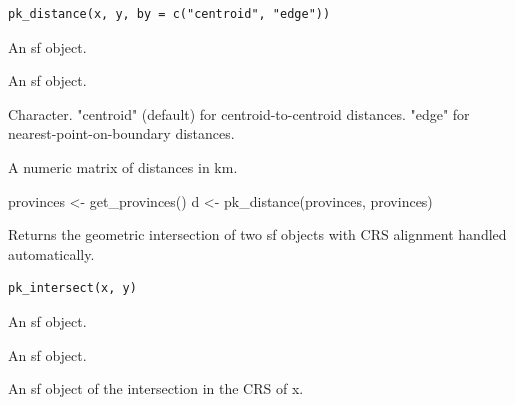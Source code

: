 \documentclass[a4paper]{book}
\begin{document}
%
\begin{Usage}
\begin{verbatim}
pk_distance(x, y, by = c("centroid", "edge"))
\end{verbatim}
\end{Usage}
%
\begin{Arguments}
\begin{ldescription}
\item[\code{x}] An sf object.

\item[\code{y}] An sf object.

\item[\code{by}] Character. "centroid" (default) for centroid-to-centroid
distances. "edge" for nearest-point-on-boundary distances.
\end{ldescription}
\end{Arguments}
%
\begin{Value}
A numeric matrix of distances in km.
\end{Value}
%
\begin{Examples}
\begin{ExampleCode}

  provinces <- get_provinces()
  d <- pk_distance(provinces, provinces)

\end{ExampleCode}
\end{Examples}
%
\begin{Description}
Returns the geometric intersection of two sf objects with CRS
alignment handled automatically.
\end{Description}
%
\begin{Usage}
\begin{verbatim}
pk_intersect(x, y)
\end{verbatim}
\end{Usage}
%
\begin{Arguments}
\begin{ldescription}
\item[\code{x}] An sf object.

\item[\code{y}] An sf object.
\end{ldescription}
\end{Arguments}
%
\begin{Value}
An sf object of the intersection in the CRS of x.
\end{Value}
\end{document}
